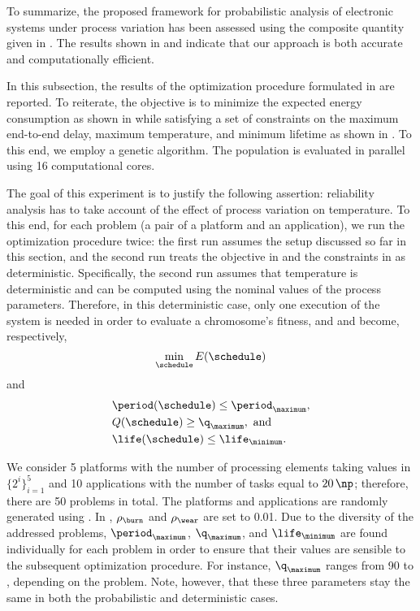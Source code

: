 To summarize, the proposed framework for probabilistic analysis of electronic
systems under process variation has been assessed using the composite quantity
given in . The results shown in
 and  indicate
that our approach is both accurate and computationally efficient.


In this subsection, the results of the optimization procedure formulated in
 are reported. To reiterate, the objective is to
minimize the expected energy consumption as shown in
 while satisfying a set of constraints on the
maximum end-to-end delay, maximum temperature, and minimum lifetime as shown in
. To this end, we employ a genetic
algorithm. The population is evaluated in parallel using 16 computational cores.

The goal of this experiment is to justify the following assertion: reliability
analysis has to take account of the effect of process variation on temperature.
To this end, for each problem (a pair of a platform and an application), we run
the optimization procedure twice: the first run assumes the setup discussed so
far in this section, and the second run treats the objective in
 and the constraints in
 as deterministic. Specifically, the second
run assumes that temperature is deterministic and can be computed using the
nominal values of the process parameters. Therefore, in this deterministic case,
only one execution of the system is needed in order to evaluate a chromosome's
fitness, and  and
 become, respectively,
\[
    \min_{\schedule} E(\schedule)
\]
and
\begin{align*}
  & \period(\schedule) \leq \period_\maximum, \\
  & Q(\schedule) \geq \q_\maximum, \text{ and} \\
  & \life(\schedule) \leq \life_\minimum.
\end{align*}

We consider 5 platforms with the number of processing elements \np taking values
in $\{ 2^i \}_{i = 1}^5$ and 10 applications with the number of tasks \nt equal
to $20 \, \np$; therefore, there are 50 problems in total. The platforms and
applications are randomly generated using  \cite{dick1998}. In
, $\rho_\burn$ and $\rho_\wear$ are set to
0.01. Due to the diversity of the addressed problems, $\period_\maximum$,
$\q_\maximum$, and $\life_\minimum$ are found individually for each problem in
order to ensure that their values are sensible to the subsequent optimization
procedure. For instance, $\q_\maximum$ ranges from 90 to ,
depending on the problem. Note, however, that these three parameters stay the
same in both the probabilistic and deterministic cases.

